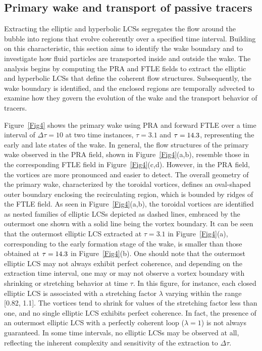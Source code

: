 \documentclass[aps,prfluids,reprint,nofootinbib,onecolumn,groupedaddress,showkeys]{revtex4-2}
\begin{document}
	\subsection{Primary wake and transport of passive tracers}
	\label{transport}
	
	Extracting the elliptic and hyperbolic LCSs segregates the flow around the bubble into regions that evolve coherently over a specified time interval. Building on this characteristic, this section aims to identify the wake boundary and to investigate how fluid particles are transported inside and outside the wake. The analysis begins by computing the PRA and FTLE fields to extract the elliptic and hyperbolic LCSs that define the coherent flow structures. Subsequently, the wake boundary is identified, and the enclosed regions are temporally advected to examine how they govern the evolution of the wake and the transport behavior of tracers.
	
	Figure~\ref{Fig4} shows the primary wake using PRA and forward FTLE over a time interval of $\Delta\tau = 10$ at two time instances, $\tau = 3.1$ and $\tau = {\color{black}14.3}$, representing the early and late states of the wake. In general, the flow structures of the primary wake observed in the PRA field, shown in Figure~\ref{Fig4}(a,b), resemble those in the corresponding FTLE field in Figure~\ref{Fig4}(c,d). However, in the PRA field, the vortices are more pronounced and easier to detect. The overall geometry of the primary wake, characterized by the toroidal vortices, defines an oval-shaped outer boundary enclosing the recirculating region, which is bounded by ridges of the FTLE field. As seen in Figure~\ref{Fig4}(a,b), the toroidal vortices are identified as nested families of elliptic LCSs depicted as dashed lines, embraced by the outermost one shown with a solid line being the vortex boundary. It can be seen that the outermost elliptic LCS extracted at $\tau = 3.1$ in Figure~\ref{Fig4}(a), corresponding to the early formation stage of the wake, is smaller than those obtained at $\tau = {\color{black}14.3}$ in Figure~\ref{Fig4}(b). One should note that the outermost elliptic LCS may not always exhibit perfect coherence, and depending on the extraction time interval, one may or may not observe a vortex boundary with shrinking or stretching behavior at time $\tau$. In this figure, for instance, each closed elliptic LCS is associated with a stretching factor $\lambda$ varying within the range [0.82, 1.1]. The vortices tend to shrink for values of the stretching factor less than one, and no single elliptic LCS exhibits perfect coherence. In fact, the presence of an outermost elliptic LCS with a perfectly coherent loop ($\lambda = 1$) is not always guaranteed. In some time intervals, no elliptic LCSs may be observed at all, reflecting the inherent complexity and sensitivity of the extraction to $\Delta\tau$.
	
\end{document}

